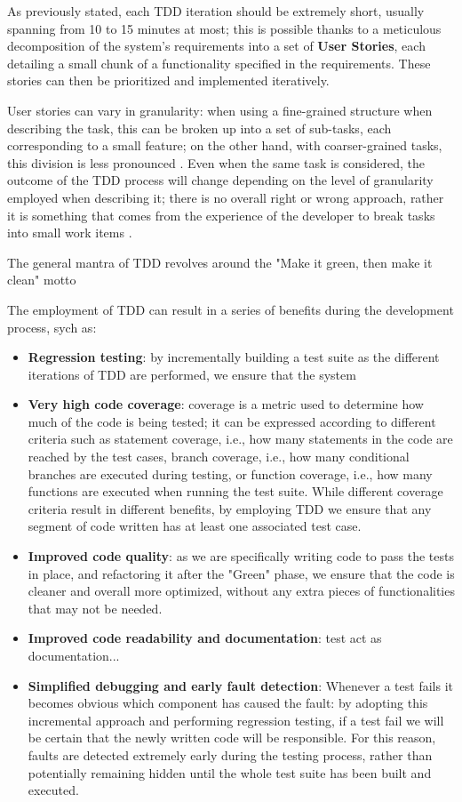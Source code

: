 As previously stated, each TDD iteration should be extremely short, usually spanning from 10 to 15 minutes at most; this is possible thanks to a meticulous decomposition of the system's requirements into a set of \textbf{User Stories}, each detailing a small chunk of a functionality specified in the requirements. These stories can then be prioritized and implemented iteratively.

User stories can vary in granularity: when using a fine-grained structure when describing the task, this can be broken up into a set of sub-tasks, each corresponding to a small feature; on the other hand, with coarser-grained tasks, this division is less pronounced \cite{DBLP:journals/tse/KaracTJ21}. Even when the same task is considered, the outcome of the TDD process will change depending on the level of granularity employed when describing it; there is no overall right or wrong approach, rather it is something that comes from the experience of the developer to break tasks into small work items \cite{DBLP:journals/tse/KaracTJ21}.

The general mantra of TDD revolves around the "Make it green, then make it clean" motto


The employment of TDD can result in a series of benefits during the development process, sych as:
\begin{itemize}
    \item \textbf{Regression testing}: by incrementally building a test suite as the different iterations of TDD are performed, we ensure that the system  
    \item \textbf{Very high code coverage}: coverage is a metric used to determine how much of the code is being tested; it can be expressed according to different criteria such as statement coverage, i.e., how many statements in the code are reached by the test cases, branch coverage, i.e., how many conditional branches are executed during testing, or function coverage, i.e., how many functions are executed when running the test suite. While different coverage criteria result in different benefits, by employing TDD we ensure that any segment of code written has at least one associated test case.
    \item \textbf{Improved code quality}: as we are specifically writing code to pass the tests in place, and refactoring it after the "Green" phase, we ensure that the code is cleaner and overall more optimized, without any extra pieces of functionalities that may not be needed. 
    \item \textbf{Improved code readability and documentation}: test act as documentation...
    \item \textbf{Simplified debugging and early fault detection}: Whenever a test fails it becomes obvious which component has caused the fault: by adopting this incremental approach and performing regression testing, if a test fail we will be certain that the newly written code will be responsible. For this reason, faults are detected extremely early during the testing process, rather than potentially remaining hidden until the whole test suite has been built and executed.
\end{itemize}


